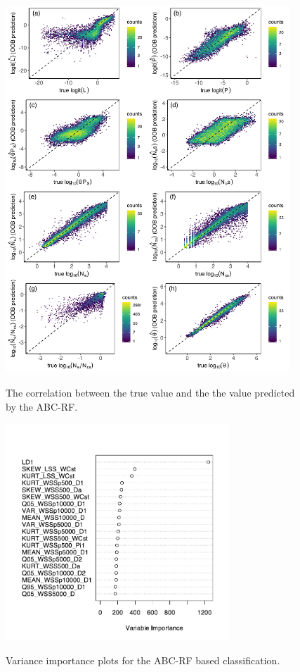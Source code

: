 \documentclass[12pt]{article}
\begin{document}
\begin{figure}[ht]
  \centering
  \includegraphics[width=0.95\textwidth]{Figures/oob_plots_ggplot2_placerita_mod.pdf}
  \label{fig:figS7}
  \caption{The correlation between the true value and the the value predicted by the ABC-RF.}
\end{figure}

\begin{figure}[ht]
  \centering
  \includegraphics[width=0.75\textwidth]{Figures/varImportance_class.pdf}
  \label{fig:figS8}
  \caption{Variance importance plots for the ABC-RF based classification.}
\end{figure}
\end{document}
